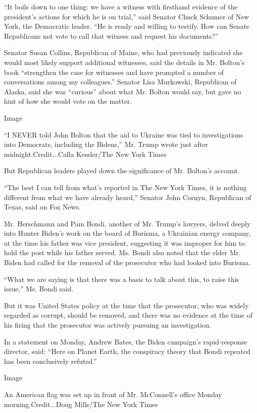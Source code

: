 ``It boils down to one thing: we have a witness with firsthand evidence
of the president's actions for which he is on trial,'' said Senator
Chuck Schumer of New York, the Democratic leader. ``He is ready and
willing to testify. How can Senate Republicans not vote to call that
witness and request his documents?''

Senator Susan Collins, Republican of Maine, who had previously indicated
she would most likely support additional witnesses, said the details in
Mr. Bolton's book ``strengthen the case for witnesses and have prompted
a number of conversations among my colleagues.'' Senator Lisa Murkowski,
Republican of Alaska, said she was ``curious'' about what Mr. Bolton
would say, but gave no hint of how she would vote on the matter.

Image

``I NEVER told John Bolton that the aid to Ukraine was tied to
investigations into Democrats, including the Bidens,'' Mr. Trump wrote
just after midnight.Credit...Calla Kessler/The New York Times

But Republican leaders played down the significance of Mr. Bolton's
account.

``The best I can tell from what's reported in The New York Times, it is
nothing different from what we have already heard,'' Senator John
Cornyn, Republican of Texas, said on Fox News.

Mr. Herschmann and Pam Bondi, another of Mr. Trump's lawyers, delved
deeply into Hunter Biden's work on the board of Burisma, a Ukrainian
energy company, at the time his father was vice president, suggesting it
was improper for him to hold the post while his father served. Ms. Bondi
also noted that the elder Mr. Biden had called for the removal of the
prosecutor who had looked into Burisma.

``What we are saying is that there was a basis to talk about this, to
raise this issue,'' Ms. Bondi said.

But it was United States policy at the time that the prosecutor, who was
widely regarded as corrupt, should be removed, and there was no evidence
at the time of his firing that the prosecutor was actively pursuing an
investigation.

In a statement on Monday, Andrew Bates, the Biden campaign's
rapid-response director, said: ``Here on Planet Earth, the conspiracy
theory that Bondi repeated has been conclusively refuted.''

Image

An American flag was set up in front of Mr. McConnell's office Monday
morning.Credit...Doug Mills/The New York Times

